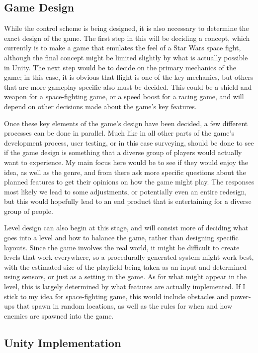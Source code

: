 \documentclass[10pt,twocolumn]{article}
\begin{document}
\subsection{Game Design}
While the control scheme is being designed, it is also necessary to determine the exact design of the game. The first step in this will be deciding a concept, which currently is to make a game that emulates the feel of a Star Wars space fight, although the final concept might be limited slightly by what is actually possible in Unity. The next step would be to decide on the primary mechanics of the game; in this case, it is obvious that flight is one of the key mechanics, but others that are more gameplay-specific also must be decided. This could be a shield and weapon for a space-fighting game, or a speed boost for a racing game, and will depend on other decisions made about the game's key features. 

Once these key elements of the game's design have been decided, a few different processes can be done in parallel. Much like in all other parts of the game's development process, user testing, or in this case surveying, should be done to see if the game design is something that a diverse group of players would actually want to experience. My main focus here would be to see if they would enjoy the idea, as well as the genre, and from there ask more specific questions about the planned features to get their opinions on how the game might play. The responses most likely we lead to some adjustments, or potentially even an entire redesign, but this would hopefully lead to an end product that is entertaining for a diverse group of people. 

Level design can also begin at this stage, and will consist more of deciding what goes into a level and how to balance the game, rather than designing specific layouts. Since the game involves the real world, it might be difficult to create levels that work everywhere, so a procedurally generated system might work best, with the estimated size of the playfield being taken as an input and determined using sensors, or just as a setting in the game. As for what might appear in the level, this is largely determined by what features are actually implemented. If I stick to my idea for space-fighting game, this would include obstacles and power-ups that spawn in random locations, as well as the rules for when and how enemies are spawned into the game.  

\subsection{Unity Implementation}
\end{document}
